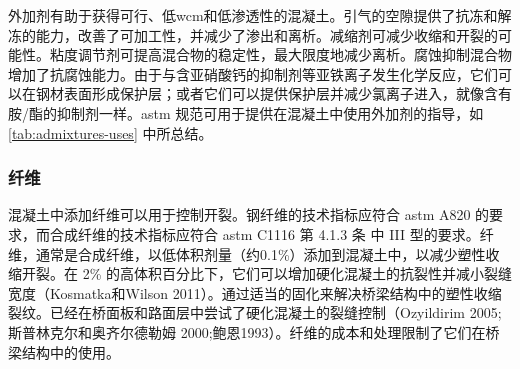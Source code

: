 外加剂有助于获得可行、低\acrlong*{wcm}和低渗透性的混凝土。引气的空隙提供了抗冻和解冻的能力，改善了可加工性，并减少了渗出和离析。减缩剂可减少收缩和开裂的可能性。粘度调节剂可提高混合物的稳定性，最大限度地减少离析。腐蚀抑制混合物增加了抗腐蚀能力。由于与含亚硝酸钙的抑制剂等亚铁离子发生化学反应，它们可以在钢材表面形成保护层；或者它们可以提供保护层并减少氯离子进入，就像含有胺/酯的抑制剂一样。\acrshort*{astm} 规范可用于提供在混凝土中使用外加剂的指导，如 \cref{tab:admixtures-uses} 中所总结。

\subsubsection{纤维}
混凝土中添加纤维可以用于控制开裂。钢纤维的技术指标应符合 \acrshort*{astm} A820 的要求，而合成纤维的技术指标应符合 \acrshort*{astm} C1116 第 4.1.3 条 中 III 型的要求。纤维，通常是合成纤维，以低体积剂量（约0.1\%）添加到混凝土中，以减少塑性收缩开裂。在 2\% 的高体积百分比下，它们可以增加硬化混凝土的抗裂性并减小裂缝宽度（Kosmatka和Wilson 2011）。通过适当的固化来解决桥梁结构中的塑性收缩裂纹。已经在桥面板和路面层中尝试了硬化混凝土的裂缝控制（Ozyildirim 2005;斯普林克尔和奥齐尔德勒姆 2000;鲍恩1993）。纤维的成本和处理限制了它们在桥梁结构中的使用。

